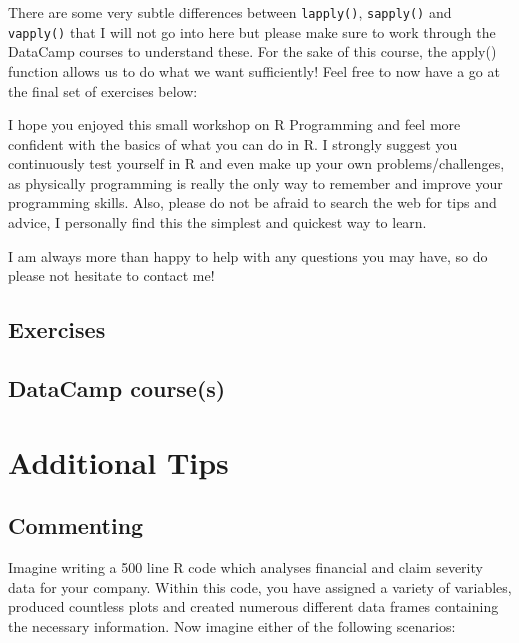 \documentclass[
]{book}
\theoremstyle{definition}
\theoremstyle{definition}
\theoremstyle{definition}
\theoremstyle{definition}
\theoremstyle{remark}
\begin{document}
There are some very subtle differences between \texttt{lapply()}, \texttt{sapply()} and \texttt{vapply()} that I will not go into here but please make sure to work through the DataCamp courses to understand these. For the sake of this course, the apply() function allows us to do what we want sufficiently! Feel free to now have a go at the final set of exercises below:

I hope you enjoyed this small workshop on R Programming and feel more confident with the basics of what you can do in R. I strongly suggest you continuously test yourself in R and even make up your own problems/challenges, as physically programming is really the only way to remember and improve your programming skills. Also, please do not be afraid to search the web for tips and advice, I personally find this the simplest and quickest way to learn.

I am always more than happy to help with any questions you may have, so do please not hesitate to contact me!

\hypertarget{exercises-5}{%
\section{Exercises}\label{exercises-5}}

\hypertarget{datacamp-courses-4}{%
\section{DataCamp course(s)}\label{datacamp-courses-4}}

\hypertarget{appendix-appendix}{%
\appendix}


\hypertarget{additional-tips}{%
\chapter{Additional Tips}\label{additional-tips}}

\hypertarget{commenting}{%
\section*{Commenting}\label{commenting}}

Imagine writing a 500 line R code which analyses financial and claim severity data for your company. Within this code, you have assigned a variety of variables, produced countless plots and created numerous different data frames containing the necessary information. Now imagine either of the following scenarios:
\end{document}
